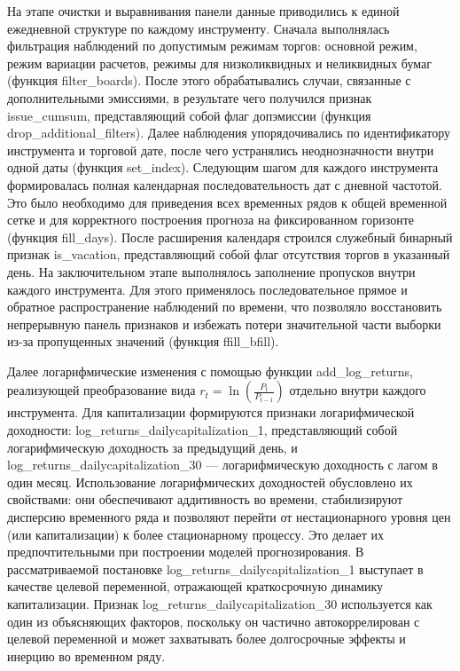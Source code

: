\documentclass[
]{article}
\begin{document}
На этапе очистки и выравнивания панели данные приводились к единой ежедневной структуре по каждому инструменту. Сначала выполнялась фильтрация наблюдений по допустимым режимам торгов: основной режим, режим вариации расчетов, режимы для низколиквидных и неликвидных бумаг (функция filter\_boards). После этого обрабатывались случаи, связанные с дополнительными эмиссиями, в результате чего получился признак issue\_cumsum, представляющий собой флаг допэмиссии (функция drop\_additional\_filters). Далее наблюдения упорядочивались по идентификатору инструмента и торговой дате, после чего устранялись неоднозначности внутри одной даты (функция set\_index). Следующим шагом для каждого инструмента формировалась полная календарная последовательность дат с дневной частотой. Это было необходимо для приведения всех временных рядов к общей временной сетке и для корректного построения прогноза на фиксированном горизонте (функция fill\_days). После расширения календаря строился служебный бинарный признак is\_vacation, представляющий собой флаг отсутствия торгов в указанный день. На заключительном этапе выполнялось заполнение пропусков внутри каждого инструмента. Для этого применялось последовательное прямое и обратное распространение наблюдений по времени, что позволяло восстановить непрерывную панель признаков и избежать потери значительной части выборки из-за пропущенных значений (функция ffill\_bfill).

Далее логарифмические изменения с помощью функции add\_log\_returns, реализующей преобразование вида \(r_{t} = \ln\left( \frac{P_{t}}{P_{t - 1}} \right)\) отдельно внутри каждого инструмента. Для капитализации формируются признаки логарифмической доходности: log\_returns\_dailycapitalization\_1, представляющий собой логарифмическую доходность за предыдущий день, и log\_returns\_dailycapitalization\_30 --- логарифмическую доходность с лагом в один месяц. Использование логарифмических доходностей обусловлено их свойствами: они обеспечивают аддитивность во времени, стабилизируют дисперсию временного ряда и позволяют перейти от нестационарного уровня цен (или капитализации) к более стационарному процессу. Это делает их предпочтительными при построении моделей прогнозирования. В рассматриваемой постановке log\_returns\_dailycapitalization\_1 выступает в качестве целевой переменной, отражающей краткосрочную динамику капитализации. Признак log\_returns\_dailycapitalization\_30 используется как один из объясняющих факторов, поскольку он частично автокоррелирован с целевой переменной и может захватывать более долгосрочные эффекты и инерцию во временном ряду.
\end{document}
